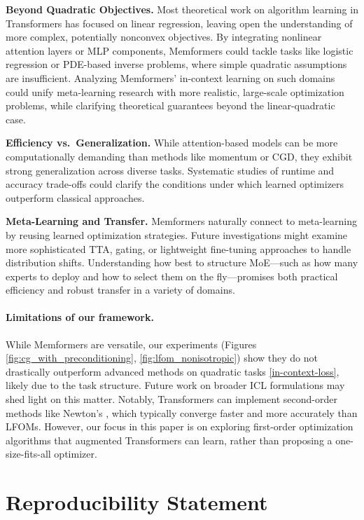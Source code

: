 \documentclass[11pt]{article}
\theoremstyle{plain}
\theoremstyle{definition}
\theoremstyle{remark}
\numberwithin{equation}{section}
\begin{document}
\textbf{Beyond Quadratic Objectives.}
Most theoretical work on algorithm learning in Transformers has focused on linear regression, leaving open the understanding of more complex, potentially nonconvex objectives. By integrating nonlinear attention layers or MLP components, Memformers could tackle tasks like logistic regression or PDE-based inverse problems, where simple quadratic assumptions are insufficient. Analyzing Memformers’ in-context learning on such domains could unify meta-learning research with more realistic, large-scale optimization problems, while clarifying theoretical guarantees beyond the linear-quadratic case.

\textbf{Efficiency vs.\ Generalization.}
While attention-based models can be more computationally demanding than methods like momentum or CGD, they exhibit strong generalization across diverse tasks. Systematic studies of runtime and accuracy trade-offs could clarify the conditions under which learned optimizers outperform classical approaches.

\textbf{Meta-Learning and Transfer.}
Memformers naturally connect to meta-learning by reusing learned optimization strategies. Future investigations might examine more sophisticated TTA, gating, or lightweight fine-tuning approaches to handle distribution shifts. Understanding how best to structure MoE—such as how many experts to deploy and how to select them on the fly—promises both practical efficiency and robust transfer in a variety of domains.

\paragraph{Limitations of our framework.}
While Memformers are versatile, our experiments (Figures \ref{fig:cg_with_preconditioning}, \ref{fig:lfom_nonisotropic}) show they do not drastically outperform advanced methods on quadratic tasks \eqref{in-context-loss}, likely due to the task structure. Future work on broader ICL formulations may shed light on this matter. Notably, Transformers can implement second-order methods like Newton’s \citep{fu2023transformers, giannou2024well}, which typically converge faster and more accurately than LFOMs. However, our focus in this paper is on exploring first-order optimization algorithms that augmented Transformers can learn, rather than proposing a one-size-fits-all optimizer.

\section*{Reproducibility Statement}
\end{document}
